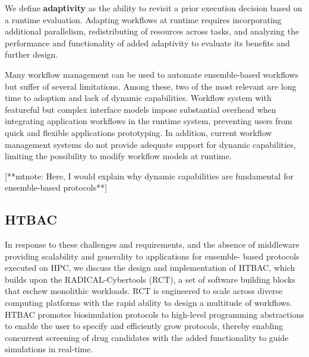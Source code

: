 We define \textbf{adaptivity} as the ability to revisit a prior execution
decision based on a runtime evaluation. Adapting workflows at runtime requires
incorporating additional parallelism, redistributing of resources across
tasks, and analyzing the performance and functionality of added adaptivity to
evaluate its benefits and further design.

Many workflow management can be used to automate ensemble-based workflows but
suffer of several limitations. Among these, two of the most relevant are long
time to adoption and lack of dynamic capabilities.
Workflow system with featureful but complex interface models impose
substantial overhead when integrating application workflows in the runtime
system, preventing users from quick and flexible applications prototyping.
In addition, current workflow management systems do not provide adequate
support for dynamic capabilities, limiting the possibility to modify workflow
models at runtime. 

[**mtnote: Here, I would explain why dynamic capabilities are fundamental for
ensemble-based protocols**]


\subsection{HTBAC}




In response to these challenges and requirements, and the absence of
middleware providing scalability and generality to applications for ensemble-
based protocols executed on HPC, we discuss the design and implementation of
HTBAC, which builds upon the RADICAL-Cybertools (RCT), a set of software
building blocks that eschew monolithic workloads. RCT is engineered to scale
across diverse computing platforms with the rapid ability to design a
multitude of workflows. HTBAC promotes biosimulation protocols to high-level
programming abstractions to enable the user to specify and efficiently grow
protocols, thereby enabling concurrent screening of drug candidates with the
added functionality to guide simulations in real-time.


